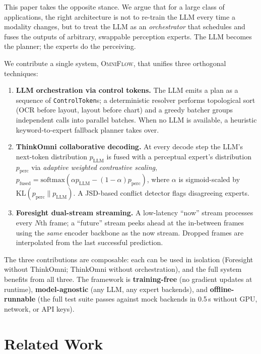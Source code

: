 \documentclass[11pt,a4paper]{article}
\newcommand{\pLLM}{p_{\mathrm{LLM}}}
\newcommand{\pperc}{p_{\mathrm{perc}}}
\newcommand{\pfused}{p_{\mathrm{fused}}}
\newcommand{\softmax}{\mathrm{softmax}}
\newcommand{\KL}{\mathrm{KL}}
\newcommand{\OmniFlow}{\textsc{OmniFlow}}
\begin{document}
This paper takes the opposite stance. We argue that for a large class of
applications, the right architecture is not to re-train the LLM every time
a modality changes, but to treat the LLM as an \emph{orchestrator} that
schedules and fuses the outputs of arbitrary, swappable perception
experts. The LLM becomes the planner; the experts do the perceiving.

We contribute a single system, \OmniFlow, that unifies three
orthogonal techniques:

\begin{enumerate}[leftmargin=*]
  \item \textbf{LLM orchestration via control tokens.} The LLM emits a
        plan as a sequence of \texttt{ControlToken}s; a deterministic
        resolver performs topological sort (OCR before layout, layout
        before chart) and a greedy batcher groups independent calls
        into parallel batches. When no LLM is available, a heuristic
        keyword-to-expert fallback planner takes over.
  \item \textbf{ThinkOmni collaborative decoding.} At every decode
        step the LLM's next-token distribution $\pLLM$ is fused with a
        perceptual expert's distribution $\pperc$ via \emph{adaptive
        weighted contrastive scaling},
        $\pfused=\softmax(\alpha\pLLM-(1-\alpha)\pperc)$, where
        $\alpha$ is sigmoid-scaled by $\KL(\pperc\|\pLLM)$. A JSD-based
        conflict detector flags disagreeing experts.
  \item \textbf{Foresight dual-stream streaming.} A low-latency ``now''
        stream processes every $N$th frame; a ``future'' stream peeks
        ahead at the in-between frames using the \emph{same} encoder
        backbone as the now stream. Dropped frames are interpolated
        from the last successful prediction.
\end{enumerate}

The three contributions are composable: each can be used in isolation
(Foresight without ThinkOmni; ThinkOmni without orchestration), and the
full system benefits from all three. The framework is
\textbf{training-free} (no gradient updates at runtime),
\textbf{model-agnostic} (any LLM, any expert backends), and
\textbf{offline-runnable} (the full test suite passes against mock
backends in 0.5\,s without GPU, network, or API keys).

\section{Related Work}\label{sec:related}
\end{document}
